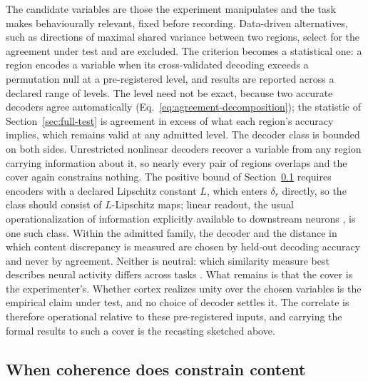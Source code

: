 \documentclass[12pt]{article}
\renewcommand{\cite}[1]{\citep{#1}}
\begin{document}
The candidate variables are those the experiment manipulates and the task makes behaviourally relevant, fixed before recording. Data-driven alternatives, such as directions of maximal shared variance between two regions, select for the agreement under test and are excluded. The criterion becomes a statistical one: a region encodes a variable when its cross-validated decoding exceeds a permutation null at a pre-registered level, and results are reported across a declared range of levels. The level need not be exact, because two accurate decoders agree automatically (Eq.~\eqref{eq:agreement-decomposition}); the statistic of Section~\ref{sec:full-test} is agreement in excess of what each region's accuracy implies, which remains valid at any admitted level. The decoder class is bounded on both sides. Unrestricted nonlinear decoders recover a variable from any region carrying information about it, so nearly every pair of regions overlaps and the cover again constrains nothing. The positive bound of Section~\ref{sec:content-connection} requires encoders with a declared Lipschitz constant $L$, which enters $\delta_r$ directly, so the class should consist of $L$-Lipschitz maps; linear readout, the usual operationalization of information explicitly available to downstream neurons \cite{dicarlo2007,kriegeskorte2019}, is one such class. Within the admitted family, the decoder and the distance in which content discrepancy is measured are chosen by held-out decoding accuracy and never by agreement. Neither is neutral: which similarity measure best describes neural activity differs across tasks \cite{bobadillasuarez2020}. What remains is that the cover is the experimenter's. Whether cortex realizes unity over the chosen variables is the empirical claim under test, and no choice of decoder settles it. The correlate is therefore operational relative to these pre-registered inputs, and carrying the formal results to such a cover is the recasting sketched above.

\subsection{When coherence does constrain content}
\label{sec:content-connection}
\end{document}
